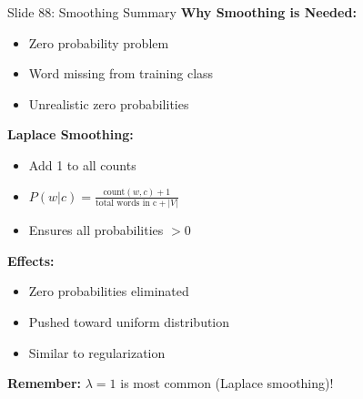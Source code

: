 \documentclass[8pt]{beamer}
\begin{document}
	\begin{frame}{Slide 88: Smoothing Summary}
		\fontsize{6.5}{7.5}\selectfont
		\textbf{Why Smoothing is Needed:}
		\begin{itemize}
			\item Zero probability problem
			\item Word missing from training class
			\item Unrealistic zero probabilities
		\end{itemize}
		
		\vspace{0.1cm}
		\textbf{Laplace Smoothing:}
		\begin{itemize}
			\item Add 1 to all counts
			\item $P(w|c) = \frac{\text{count}(w,c) + 1}{\text{total words in c} + |V|}$
			\item Ensures all probabilities $> 0$
		\end{itemize}
		
		\vspace{0.1cm}
		\textbf{Effects:}
		\begin{itemize}
			\item Zero probabilities eliminated
			\item Pushed toward uniform distribution
			\item Similar to regularization
		\end{itemize}
		
		\textcolor{myblue}{\textbf{Remember:}} $\lambda = 1$ is most common (Laplace smoothing)!
	\end{frame}
	
\end{document}
